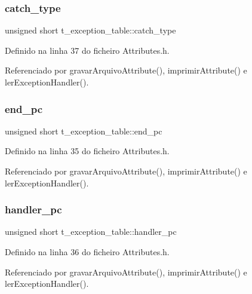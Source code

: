 \subsubsection{\texorpdfstring{catch\+\_\+type}{catch\_type}}
{\footnotesize\ttfamily unsigned short t\+\_\+exception\+\_\+table\+::catch\+\_\+type}



Definido na linha 37 do ficheiro Attributes.\+h.



Referenciado por gravar\+Arquivo\+Attribute(), imprimir\+Attribute() e ler\+Exception\+Handler().

\mbox{\label{structt__exception__table_a0e650c1f5254b1163fb64c19524e45cf}} 
\subsubsection{\texorpdfstring{end\+\_\+pc}{end\_pc}}
{\footnotesize\ttfamily unsigned short t\+\_\+exception\+\_\+table\+::end\+\_\+pc}



Definido na linha 35 do ficheiro Attributes.\+h.



Referenciado por gravar\+Arquivo\+Attribute(), imprimir\+Attribute() e ler\+Exception\+Handler().

\mbox{\label{structt__exception__table_adeddab7249cce7351d5f8387ccae0963}} 
\subsubsection{\texorpdfstring{handler\+\_\+pc}{handler\_pc}}
{\footnotesize\ttfamily unsigned short t\+\_\+exception\+\_\+table\+::handler\+\_\+pc}



Definido na linha 36 do ficheiro Attributes.\+h.



Referenciado por gravar\+Arquivo\+Attribute(), imprimir\+Attribute() e ler\+Exception\+Handler().

